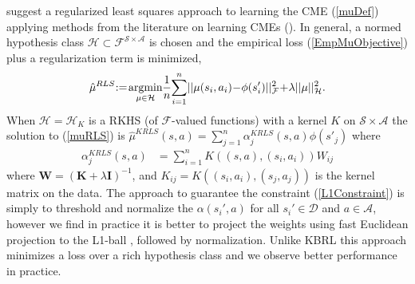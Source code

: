 \documentclass[letterpaper]{article}
\newcommand{\GrunewalderEmbeddingsRL}{GrunewalderEmbeddingsMDP}
\newcommand{\GrunewalderEmbeddingsRegression}{GrunewalderEmbeddingsRegression}
\newcommand{\SongNonparametric}{DBLP:journals/jmlr/SongGG10}
\newcommand{\OrmoneitKBRL}{DBLP:journals/ml/OrmoneitS02}
\newcommand{\DuchiProjections}{DBLP:conf/icml/DuchiSSC08}
\newcommand{\TibshiraniLasso}{tibshirani96regression}
\newcommand{\cD}{{\mathcal D}}
\newcommand{\cH}{{\mathcal H}}
\newcommand{\cF}{{\mathcal F}}
\newcommand{\cA}{{\mathcal A}}
\newcommand{\cS}{{\mathcal S}}
\newcommand{\balpha}{{\bm \alpha}}
\newcommand{\bbeta}{{\bm \beta}}
\newcommand{\bK}{{\bm K}}
\newcommand{\bW}{{\bm W}}
\newcommand{\bI}{{\bm I}}
\newcommand{\E}{{\mathbb E}}
\newcommand{\R}{{\mathbb R}}
\newcommand{\argmin}{\operatornamewithlimits{argmin}}
\newcommand{\nn}{\nonumber}
\begin{document}
\cite{\GrunewalderEmbeddingsRL} suggest a regularized least squares approach to learning the CME (\ref{muDef}) applying methods from the literature on learning CMEs (\cite{\SongNonparametric,\GrunewalderEmbeddingsRegression}). In general, a normed hypothesis class $\cH\subset \cF^{\cS\times\cA}$ is chosen and the empirical loss (\ref{EmpMuObjective}) plus a regularization term is minimized,
\begin{align}
\hat\mu^{RLS}\hspace{-0.9mm} := \hspace{-0.6mm}\argmin_{\mu\in\cH}  \hspace{-0.7mm}\frac{1}{n}\hspace{-0.7mm}\sum_{i=1}^n\hspace{-0.6mm} || \mu (s_i,a_i) \hspace{-0.7mm}-\hspace{-0.7mm} \phi(s'_i) ||_\cF^2 \hspace{-0.7mm}+\hspace{-0.7mm}\lambda ||\mu||^2_{\cH} . \label{muRLS}
\end{align}
When $\cH=\cH_K$ is a RKHS (of $\cF$-valued functions) with a kernel $K$ on $\cS\times\cA$ the solution to (\ref{muRLS}) is $\hat\mu^{KRLS}(s,a) = \sum_{j=1}^n \alpha_j^{KRLS}(s,a) \phi(s'_j)$ where
\begin{align}
\alpha_j^{KRLS}(s,a) &=  \sum_{i=1}^n K((s,a),(s_i,a_i)) W_{ij}  \label{KRLSalphas}
\end{align}
where $\bW = (\bK + \lambda \bI)^{-1}$, and $K_{ij} = K((s_i,a_i),(s_j,a_j))$ is the kernel matrix on the data. The approach to guarantee the constraint (\ref{L1Constraint}) is simply to threshold and normalize the $\alpha(s_i',a)$ for all $s_i'\in\cD$ and $a\in\cA$, however we find in practice it is better to project the weights using fast Euclidean projection to the L1-ball \citep[e.g.][]{\DuchiProjections}, followed by normalization.%
Unlike KBRL \citep{\OrmoneitKBRL} this approach minimizes a loss over a rich hypothesis class and we observe better performance in practice.
\end{document}
